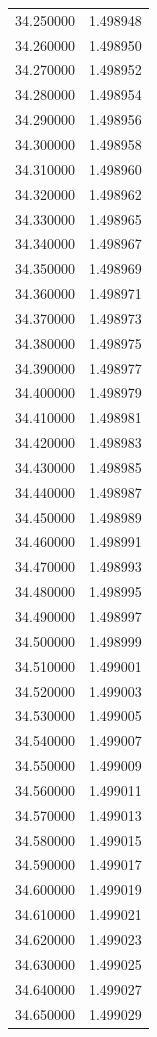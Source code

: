 \begin{tabular}{rr}
34.250000 & 1.498948 \\
34.260000 & 1.498950 \\
34.270000 & 1.498952 \\
34.280000 & 1.498954 \\
34.290000 & 1.498956 \\
34.300000 & 1.498958 \\
34.310000 & 1.498960 \\
34.320000 & 1.498962 \\
34.330000 & 1.498965 \\
34.340000 & 1.498967 \\
34.350000 & 1.498969 \\
34.360000 & 1.498971 \\
34.370000 & 1.498973 \\
34.380000 & 1.498975 \\
34.390000 & 1.498977 \\
34.400000 & 1.498979 \\
34.410000 & 1.498981 \\
34.420000 & 1.498983 \\
34.430000 & 1.498985 \\
34.440000 & 1.498987 \\
34.450000 & 1.498989 \\
34.460000 & 1.498991 \\
34.470000 & 1.498993 \\
34.480000 & 1.498995 \\
34.490000 & 1.498997 \\
34.500000 & 1.498999 \\
34.510000 & 1.499001 \\
34.520000 & 1.499003 \\
34.530000 & 1.499005 \\
34.540000 & 1.499007 \\
34.550000 & 1.499009 \\
34.560000 & 1.499011 \\
34.570000 & 1.499013 \\
34.580000 & 1.499015 \\
34.590000 & 1.499017 \\
34.600000 & 1.499019 \\
34.610000 & 1.499021 \\
34.620000 & 1.499023 \\
34.630000 & 1.499025 \\
34.640000 & 1.499027 \\
34.650000 & 1.499029 \\

\end{tabular}
